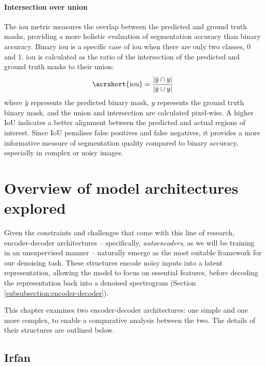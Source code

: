 \paragraph{Intersection over union}
The \acrfull{iou} metric measures the overlap between the predicted and ground truth masks, providing a more holistic evaluation of segmentation accuracy than binary accuracy. Binary \acrshort{iou} is a specific case of \acrshort{iou} when there are only two classes, 0 and 1. \acrshort{iou} is calculated as the ratio of the intersection of the predicted and ground truth masks to their union:
\begin{equation}
\text{\acrshort{iou}} = \frac{\left| \hat{y} \cap y \right|}{\left| \hat{y} \cup y \right|}
\end{equation}
where $\hat{y}$ represents the predicted binary mask, $y$ represents the ground truth binary mask, and the union and intersection are calculated pixel-wise. A higher IoU indicates a better alignment between the predicted and actual regions of interest. Since IoU penalises false positives and false negatives, it provides a more informative measure of segmentation quality compared to binary accuracy, especially in complex or noisy images.

\section{Overview of model architectures explored}

Given the constraints and challenges that come with this line of research, encoder-decoder architectures -- specifically, \textit{autoencoders}, as we will be training in an unsupervised manner -- naturally emerge as the most suitable framework for our denoising task. These structures encode noisy inputs into a latent representation, allowing the model to focus on essential features, before decoding the representation back into a denoised spectrogram (Section \ref{subsubsection:encoder-decoder}). 

This chapter examines two encoder-decoder architectures: one simple and one more complex, to enable a comparative analysis between the two. The details of their structures are outlined below.

\subsection{Irfan}

